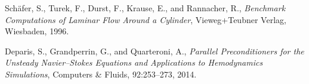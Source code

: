\documentclass{article}
\begin{document}
\begin{thebibliography}{99}
  Schäfer, S., Turek, F., Durst, F., Krause, E., and Rannacher, R.,
  \emph{Benchmark Computations of Laminar Flow Around a Cylinder},
  Vieweg+Teubner Verlag,
  Wiesbaden,
  1996.

  Deparis, S., Grandperrin, G., and Quarteroni, A.,
  \emph{Parallel Preconditioners for the Unsteady Navier–Stokes Equations and Applications to Hemodynamics Simulations},
  Computers \& Fluids,
  92:253–273,
  2014.
\end{thebibliography}
\end{document}
